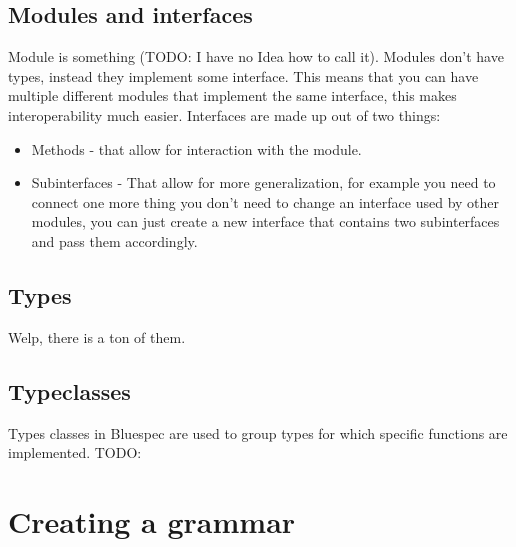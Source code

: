 \documentclass[14pt]{report}
\begin{document}
\subsection{Modules and interfaces}
Module is something (TODO: I have no Idea how to call it). Modules don't have types, instead they implement some interface. This means that you can have multiple different modules that implement the same interface, this makes interoperability much easier. Interfaces are made up out of two things:
    \begin{itemize}
        \item Methods - that allow for interaction with the module.
        \item Subinterfaces - That allow for more generalization, for example you need to connect one more thing you don't need to change an interface used by other modules, you can just create a new interface that contains two subinterfaces and pass them accordingly.
    \end{itemize}

\subsection{Types}
Welp, there is a ton of them.
\subsection{Typeclasses}
Types classes in Bluespec are used to group types for which specific functions are implemented. TODO:

\section{Creating a grammar}
\end{document}
